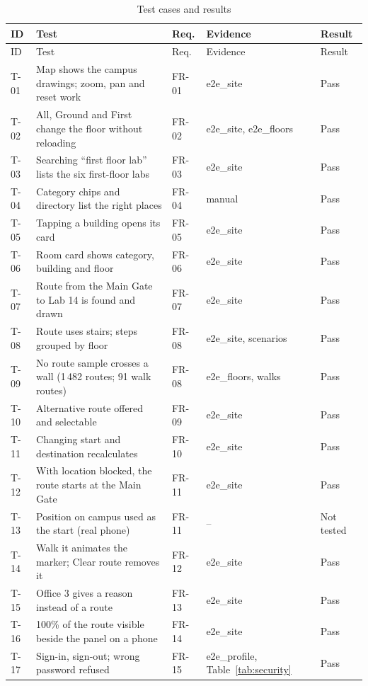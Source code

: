 \documentclass[12pt,a4paper]{report}
\newcommand{\tablespacing}{\singlespacing\small}
\begin{document}
{\tablespacing
\begin{longtable}{p{0.9cm}>{\raggedright}p{6.3cm}>{\raggedright}p{1.4cm}>{\raggedright}p{3.4cm}>{\raggedright\arraybackslash}p{1.3cm}}
\caption{Test cases and results}\label{tab:cases}\\
\toprule
ID & Test & Req. & Evidence & Result \\
\midrule\endfirsthead
\toprule
ID & Test & Req. & Evidence & Result \\
\midrule\endhead
\bottomrule\endfoot
T-01 & Map shows the campus drawings; zoom, pan and reset work & FR-01 & e2e\_site & Pass \\
T-02 & All, Ground and First change the floor without reloading & FR-02 & e2e\_site, e2e\_floors & Pass \\
T-03 & Searching ``first floor lab'' lists the six first-floor labs & FR-03 & e2e\_site & Pass \\
T-04 & Category chips and directory list the right places & FR-04 & manual & Pass \\
T-05 & Tapping a building opens its card & FR-05 & e2e\_site & Pass \\
T-06 & Room card shows category, building and floor & FR-06 & e2e\_site & Pass \\
T-07 & Route from the Main Gate to Lab 14 is found and drawn & FR-07 & e2e\_site & Pass \\
T-08 & Route uses stairs; steps grouped by floor & FR-08 & e2e\_site, scenarios & Pass \\
T-09 & No route sample crosses a wall (1\,482 routes; 91 walk routes) & FR-08 & e2e\_floors, walks & Pass \\
T-10 & Alternative route offered and selectable & FR-09 & e2e\_site & Pass \\
T-11 & Changing start and destination recalculates & FR-10 & e2e\_site & Pass \\
T-12 & With location blocked, the route starts at the Main Gate & FR-11 & e2e\_site & Pass \\
T-13 & Position on campus used as the start (real phone) & FR-11 & -- & Not tested \\
T-14 & Walk it animates the marker; Clear route removes it & FR-12 & e2e\_site & Pass \\
T-15 & Office 3 gives a reason instead of a route & FR-13 & e2e\_site & Pass \\
T-16 & 100\% of the route visible beside the panel on a phone & FR-14 & e2e\_site & Pass \\
T-17 & Sign-in, sign-out; wrong password refused & FR-15 & e2e\_profile, Table~\ref{tab:security} & Pass \\

\end{longtable}}
\end{document}
